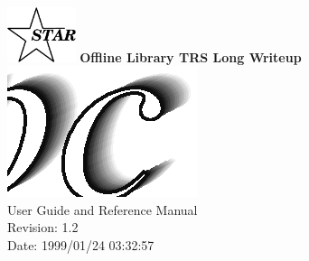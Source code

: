 \documentclass[twoside]{article}
\begin{document}
%
%
\begin{titlepage}
\pagestyle{empty}
\vspace*{-35mm}
\begin{center}
  \mbox{\includegraphics[width=2cm]{StarIcon.eps}}
  {\Large\bf Offline Library TRS Long Writeup}
  \hfill\mbox{}\\[3cm]
  \mbox{\includegraphics[width=\textwidth]{trsTitle.eps}}
  \hfill\mbox{}\\[3cm]
  {\LARGE User Guide and Reference Manual}\\[2cm]
  {\LARGE $ $Revision: 1.2 $ $}  \\[5mm] %
  {\LARGE $ $Date: 1999/01/24 03:32:57 $ $}  %
  \vfill
\end{center}
\cleardoublepage
\end{titlepage}

%
%
\tableofcontents
\cleardoublepage

%
%
\end{document}
